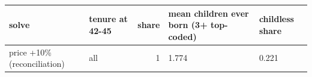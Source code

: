 \begingroup\small
\setlength{\tabcolsep}{3pt}
\renewcommand{\arraystretch}{1.04}
\begin{tabularx}{\linewidth}{XXrXX}
\toprule
solve & tenure at 42-45 & share & mean children ever born (3+ top-coded) & childless share \\
\midrule
price +10\% (reconciliation) & all & 1 & 1.774 & 0.221 \\
\bottomrule
\end{tabularx}
\endgroup
